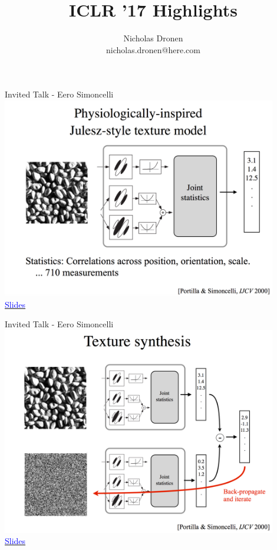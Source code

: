 \documentclass[]{beamer}
\begin{document}

\title{ICLR '17 Highlights}
\author{Nicholas Dronen \\ nicholas.dronen@here.com}

\begin{frame}
\maketitle
\end{frame}

\begin{frame}{Invited Talk - Eero Simoncelli}
\centering
\includegraphics[width=0.9\textwidth]{figures/simoncelli-julesz-model} \\
\href{http://iclr.cc/lib/exe/fetch.php?media=iclr2017:simoncelli\_iclr2017.pdf}{\textcolor{blue}{Slides}}
\end{frame}

\begin{frame}{Invited Talk - Eero Simoncelli}
\centering
\includegraphics[width=0.9\textwidth]{figures/simoncelli-texture-synthesis} \\
\href{http://iclr.cc/lib/exe/fetch.php?media=iclr2017:simoncelli\_iclr2017.pdf}{\textcolor{blue}{Slides}}
\end{frame}
\end{document}
